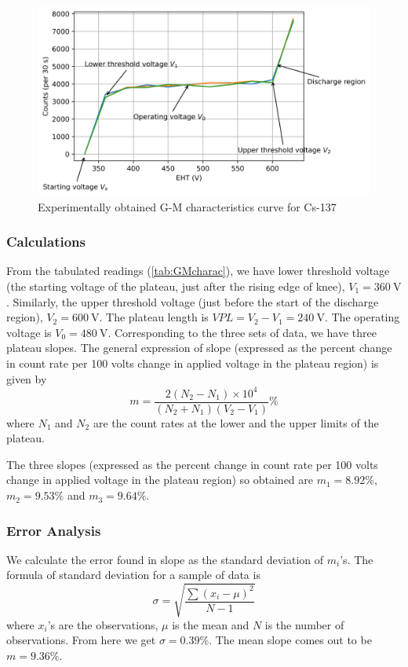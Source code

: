 \documentclass[%
 reprint,
nofootinbib,
 amsmath,amssymb,
 aps,
floatfix,
]{revtex4-2}
\begin{document}
        \begin{figure}
            \centering
            \includegraphics[scale = 0.59]{Figures/plot-GMcharac.png}
            \caption{Experimentally obtained G-M characteristics curve for Cs-137}
            \label{fig:gmcharac}
        \end{figure}
        \subsubsection{Calculations}
        From the tabulated readings (\ref{tab:GMcharac}), we have lower threshold voltage (the starting voltage of the plateau, just after the rising edge of knee), $V_1 = \SI{360}{\volt}$. Similarly, the upper threshold voltage (just before the start of the discharge region), $V_2 = \SI{600}{\volt}$. The plateau length is $VPL = V_2 - V_1 = \SI{240}{\volt}$. The operating voltage is $V_0 = \SI{480}{\volt}$. Corresponding to the three sets of data, we have three plateau slopes. The general expression of slope (expressed as  the percent change in count rate per 100 volts change in applied voltage in the plateau region) is given by
        \begin{equation}
            m = \dfrac{2 (N_2 - N_1) \times 10^4}{(N_2 + N_1)(V_2 - V_1)} \%
        \end{equation}
        where $N_1$ and $N_2$ are the count rates at the lower and the upper limits of the plateau.
        \par
        The three slopes (expressed as  the percent change in count rate per 100 volts change in applied voltage in the plateau region) so obtained are $m_1 = 8.92\%$, $m_2 = 9.53\%$ and $m_3 = 9.64\%$.
        \subsubsection{Error Analysis}
        We calculate the error found in slope as the standard deviation of $m_i$'s. The formula of standard deviation for a sample of data is
        \begin{equation}
            \sigma = \sqrt{\dfrac{\sum (x_i - \mu)^2}{N-1}}
        \end{equation}
        where $x_i$'s are the observations, $\mu$ is the mean and $N$ is the number of observations. From here we get $\sigma = 0.39\%$. The mean slope comes out to be $m = 9.36\%$.
\end{document}
